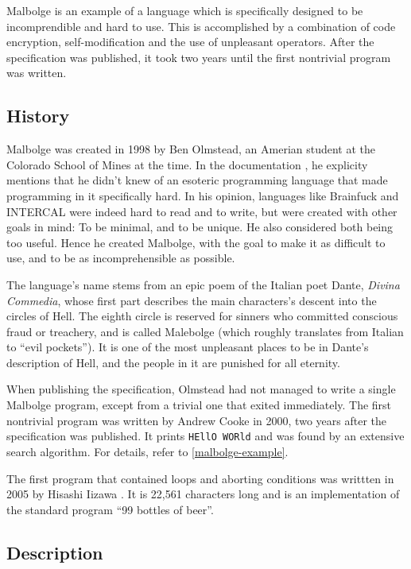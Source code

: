 Malbolge is an example of a language which is specifically designed to be incomprendible and hard to use. This is accomplished by a combination of code encryption, self-modification and the use of unpleasant operators. After the specification was published, it took two years until the first nontrivial program was written.

\subsection{History}

Malbolge was created in 1998 by Ben Olmstead, an Amerian student at the Colorado School of Mines at the time. In the documentation \cite{olmstead1998malbolge}, he explicity mentions that he didn't knew of an esoteric programming language that made programming in it specifically hard. In his opinion, languages like Brainfuck and INTERCAL were indeed hard to read and to write, but were created with other goals in mind: To be minimal, and to be unique. He also considered both being too useful. Hence he created Malbolge, with the goal to make it as difficult to use, and to be as incomprehensible as possible.

The language's name stems from an epic poem of the Italian poet Dante, \emph{Divina Commedia}, whose first part describes the main characters's descent into the circles of Hell. The eighth circle is reserved for sinners who committed conscious fraud or treachery, and is called Malebolge (which roughly translates from Italian to “evil pockets”). It is one of the most unpleasant places to be in Dante's description of Hell, and the people in it are punished for all eternity.

When publishing the specification, Olmstead had not managed to write a single Malbolge program, except from a trivial one that exited immediately. The first nontrivial program was written by Andrew Cooke in 2000, two years after the specification was published. It prints \texttt{HEllO WORld} \cite{cooke2000malbolge} and was found by an extensive search algorithm. For details, refer to \cref{malbolge-example}.

The first program that contained loops and aborting conditions was writtten in 2005 by Hisashi Iizawa \cite{iizawa2005malbolge}. It is 22,561 characters long and is an implementation of the standard program “99 bottles of beer”.

\subsection{Description}

